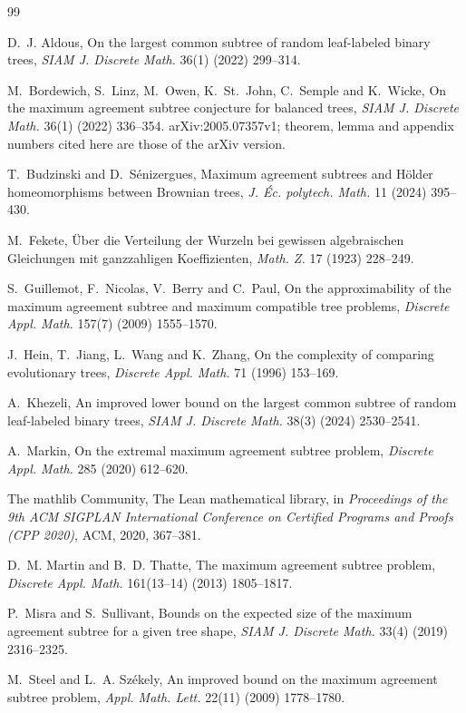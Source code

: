 \documentclass[11pt]{amsart}
\theoremstyle{definition}
\begin{document}
\enlargethispage{3\baselineskip}
\begin{thebibliography}{99}

 D.~J. Aldous, On the largest common subtree of random leaf-labeled binary
trees, \emph{SIAM J. Discrete Math.} 36(1) (2022) 299--314.

 M.~Bordewich, S.~Linz, M.~Owen, K.~St.~John, C.~Semple and K.~Wicke, On the
maximum agreement subtree conjecture for balanced trees, \emph{SIAM J. Discrete Math.} 36(1)
(2022) 336--354. arXiv:2005.07357v1; theorem, lemma and appendix numbers cited here are those of the
arXiv version.

 T.~Budzinski and D.~S\'enizergues, Maximum agreement subtrees and H\"older
homeomorphisms between Brownian trees, \emph{J. \'Ec. polytech. Math.} 11 (2024) 395--430.

 M.~Fekete, \"Uber die Verteilung der Wurzeln bei gewissen algebraischen
Gleichungen mit ganzzahligen Koeffizienten, \emph{Math. Z.} 17 (1923) 228--249.

 S.~Guillemot, F.~Nicolas, V.~Berry and C.~Paul, On the approximability of the
maximum agreement subtree and maximum compatible tree problems, \emph{Discrete Appl. Math.} 157(7)
(2009) 1555--1570.

 J.~Hein, T.~Jiang, L.~Wang and K.~Zhang, On the complexity of comparing evolutionary
trees, \emph{Discrete Appl. Math.} 71 (1996) 153--169.

 A.~Khezeli, An improved lower bound on the largest common subtree of random
leaf-labeled binary trees, \emph{SIAM J. Discrete Math.} 38(3) (2024) 2530--2541.

 A.~Markin, On the extremal maximum agreement subtree problem, \emph{Discrete
Appl. Math.} 285 (2020) 612--620.

 The mathlib Community, The Lean mathematical library, in \emph{Proceedings of the 9th
ACM SIGPLAN International Conference on Certified Programs and Proofs (CPP 2020)}, ACM, 2020, 367--381.

 D.~M. Martin and B.~D. Thatte, The maximum agreement subtree problem,
\emph{Discrete Appl. Math.} 161(13--14) (2013) 1805--1817.

 P.~Misra and S.~Sullivant, Bounds on the expected size of the maximum agreement
subtree for a given tree shape, \emph{SIAM J. Discrete Math.} 33(4) (2019) 2316--2325.

 M.~Steel and L.~A. Sz\'ekely, An improved bound on the maximum agreement subtree
problem, \emph{Appl. Math. Lett.} 22(11) (2009) 1778--1780.

\end{thebibliography}
\end{document}
